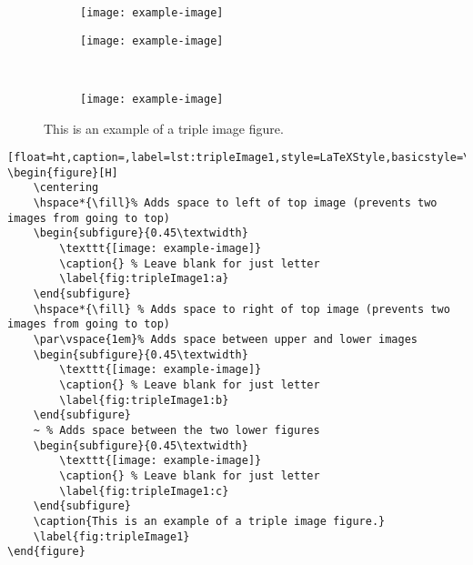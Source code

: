 		\vspace*{\fill}
		\begin{figure}[H]
			\centering
			\hspace*{\fill}%
			\begin{subfigure}{0.45\textwidth}
				\texttt{[image: example-image]}
				\caption{} %
				\label{fig:tripleImage1:a}
			\end{subfigure}
			\hspace*{\fill} %
			\par\vspace{1em}%
			\begin{subfigure}{0.45\textwidth}
				\texttt{[image: example-image]}
				\caption{} %
				\label{fig:tripleImage1:b}
			\end{subfigure}
			~ %
			\begin{subfigure}{0.45\textwidth}
				\texttt{[image: example-image]}
				\caption{} %
				\label{fig:tripleImage1:c}
			\end{subfigure}
			\caption{This is an example of a triple image figure.}
			\label{fig:tripleImage1}
		\end{figure}
		\begin{lstlisting}[float=ht,caption=,label=lst:tripleImage1,style=LaTeXStyle,basicstyle=\tiny\ttfamily,]
\begin{figure}[H]
	\centering
	\hspace*{\fill}% Adds space to left of top image (prevents two images from going to top)
	\begin{subfigure}{0.45\textwidth}
		\texttt{[image: example-image]}
		\caption{} % Leave blank for just letter
		\label{fig:tripleImage1:a}
	\end{subfigure}
	\hspace*{\fill} % Adds space to right of top image (prevents two images from going to top)
	\par\vspace{1em}% Adds space between upper and lower images
	\begin{subfigure}{0.45\textwidth}
		\texttt{[image: example-image]}
		\caption{} % Leave blank for just letter
		\label{fig:tripleImage1:b}
	\end{subfigure}
	~ % Adds space between the two lower figures
	\begin{subfigure}{0.45\textwidth}
		\texttt{[image: example-image]}
		\caption{} % Leave blank for just letter
		\label{fig:tripleImage1:c}
	\end{subfigure}
	\caption{This is an example of a triple image figure.}
	\label{fig:tripleImage1}
\end{figure}
		\end{lstlisting}
		\vspace*{\fill}
		\pagebreak



